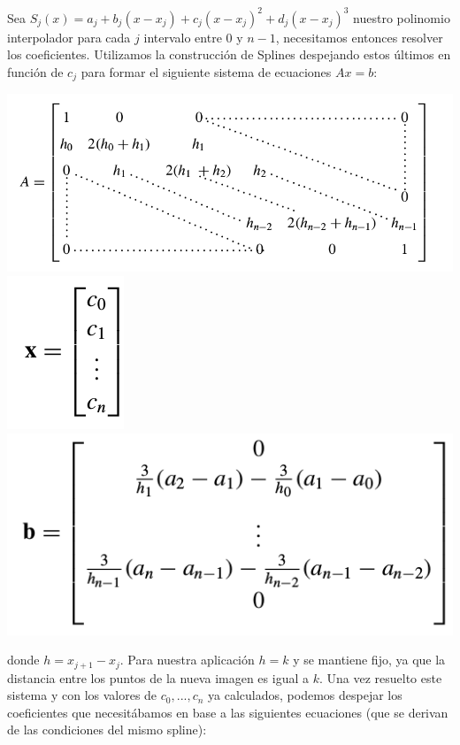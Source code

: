 Sea $S_{j}(x) = a_{j} + b_{j}(x - x_{j}) + c_{j}(x - x_{j})^2 + d_{j}(x - x_{j})^3$ nuestro polinomio interpolador para cada $j$ intervalo entre $0$ y $n-1$, necesitamos entonces resolver los coeficientes. Utilizamos la construcción de Splines despejando estos últimos en función de $c_{j}$ para formar el siguiente sistema de ecuaciones $Ax = b$:

\begin{center}
\includegraphics[scale=0.50]{imagenes/A.png}
\includegraphics[scale=0.50]{imagenes/x.png}
\includegraphics[scale=0.50]{imagenes/b.png}
\end{center}

donde $h = x_{j+1} - x_{j}$. Para nuestra aplicación $h = k$ y se mantiene fijo, ya que la distancia entre los puntos de la nueva imagen es igual a $k$. Una vez resuelto este sistema y con los valores de $c_{0},..., c_{n}$ ya calculados, podemos despejar los coeficientes que necesitábamos en base a las siguientes ecuaciones (que se derivan de las condiciones del mismo spline):

